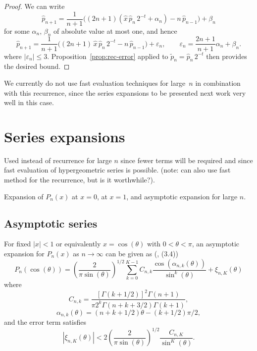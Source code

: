 \documentclass[11pt,a4paper]{article}
\newcommand{\abs}[1]{\mathopen| #1 \mathclose|}
\begin{document}
\begin{proof}
We can write
\[
  \hat{p}_{n + 1} = \frac{1}{n + 1}  \bigl((2 n + 1)  (\hat{x} \,
        \hat{p}_n \, 2^{- t} + \alpha_n) - n \, \hat{p}_{n - 1}\bigr)
        + \beta_n
\]
for some $\alpha_n$, $\beta_n$ of absolute value at most one, and
hence
\[
  \hat{p}_{n + 1} = \frac{1}{n + 1}  \bigl((2 n + 1) \, \hat{x} \,
  \hat{p}_n \, 2^{- t} - n \, \hat{p}_{n - 1}\bigr) + \varepsilon_n,
  \qquad
  \varepsilon_n = \frac{2 n + 1}{n + 1} \alpha_n + \beta_n.
\]
where $\abs{\varepsilon_n} \leq 3$.
Proposition \ref{prop:rec-error} applied to
$\tilde p_n = \hat p_n \, 2^{-t}$
then provides the desired bound.
\end{proof}

We currently do not use fast evaluation techniques for large~$n$ in
combination with this recurrence, since the series expansions to be
presented next work very well in this case.

\section{Series expansions}

\label{sec:series}

Used instead of recurrence for large $n$ since fewer terms will
be required and since fast evaluation of hypergeometric series
is possible.
(note: can also use fast method for the
recurrence, but is it worthwhile?).

Expansion of $P_n(x)$ at $x = 0$, at $x = 1$, and
asymptotic expansion for large $n$.

\subsection{Asymptotic series}

For fixed $|x| < 1$ or equivalently $x = \cos(\theta)$ with $0 < \theta < \pi$,
an asymptotic expansion for $P_n(x)$ as $n \to \infty$
can be given as (\cite{Bogaert2012}, (3.4))
\begin{equation}
\label{eq:asymptotic}
P_n(\cos(\theta)) = \left(\frac{2}{\pi \sin(\theta)}\right)^{1/2}
\sum_{k=0}^{K-1} C_{n,k} \frac{\cos(\alpha_{n,k}(\theta))}{\sin^k(\theta)}
+ \xi_{n,K}(\theta)
\end{equation}
where
\begin{equation}
C_{n,k} = \frac{[\Gamma(k+1/2)]^2 \Gamma(n+1)}{\pi 2^k \Gamma(n+k+3/2) \Gamma(k+1)},
\end{equation}
\begin{equation}
\alpha_{n,k}(\theta) = (n+k+1/2) \theta - (k+1/2) \pi / 2,
\end{equation}
and the error term satisfies
\begin{equation}
|\xi_{n,K}(\theta)| < 2 \left(\frac{2}{\pi \sin(\theta)}\right)^{1/2} \frac{C_{n,K}}{\sin^K(\theta)}.
\end{equation}
\end{document}
